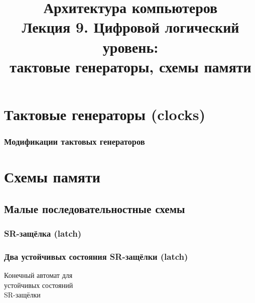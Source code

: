 \newcommand{\h}{%
handout,%
}



\usepackage{tikz}
\usetikzlibrary{arrows,automata}

\usepackage{framed}
\usepackage{tabu}

\newcommand{\p}{\textbf{\textcolor{green}{+}}}
\newcommand{\myminus}{\textbf{\textcolor{red}{–}}}

\title[Цифровая логика: схемы памяти]{Архитектура компьютеров\texorpdfstring{\\}{ }Лекция 9. Цифровой логический уровень:\texorpdfstring{\\}{ }тактовые генераторы, схемы памяти}



\begin{frame}
\titlepage
\end{frame}

\section{Тактовые генераторы (clocks)}
\begin{frame}
\frametitle{Модификации тактовых генераторов}
\end{frame}

\section {Схемы памяти}

\subsection{Малые последовательностные схемы}

\begin{frame}
\frametitle{SR-защёлка (latch)}
\end{frame}

\begin{frame}
\frametitle{Два устойчивых состояния SR-защёлки (latch)}

\begin{minipage}{8cm}
\begin{framed}
\vspace{-.2cm}
        \parbox{4cm}{Конечный автомат для\\
            устойчивых состояний\\SR-защёлки}
        \parbox{3cm}{}
\vspace{-.2cm}
\end{framed}
\end{minipage}
\end{frame}


